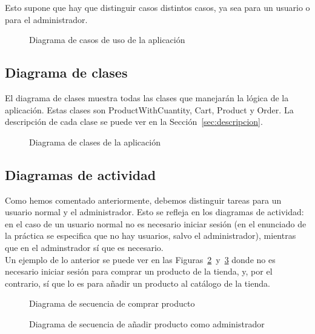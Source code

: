 \documentclass[12pt,a4paper,svgnames]{article}
\begin{document}
Esto supone que hay que distinguir casos distintos casos, ya sea para un usuario o para el administrador.  
\begin{figure}[htbp]
	\centering
	\casosdeuso
	\caption{Diagrama de casos de uso de la aplicación}
	\label{fig:casosdeuso}
\end{figure}

\clearpage

\subsection{Diagrama de clases}

El diagrama de clases muestra todas las clases que manejarán la lógica de la aplicación. Estas clases son ProductWithCuantity, Cart, Product y Order. La descripción de cada clase se puede ver en la Sección~\ref{sec:descripcion}.

\begin{figure}[htbp] 
	\centering
	\clases
	\caption{Diagrama de clases de la aplicación}
\end{figure}

\subsection{Diagramas de actividad}

Como hemos comentado anteriormente, debemos distinguir tareas para un usuario normal y el administrador. Esto se refleja en los diagramas de actividad: en el caso de un usuario normal no es necesario iniciar sesión (en el enunciado de la práctica se especifica que no hay usuarios, salvo el administrador), mientras que en el adminstrador sí que es necesario.\\

Un ejemplo de lo anterior se puede ver en las Figuras~\ref{fig:actividad1}~y~\ref{fig:actividad2} donde no es necesario iniciar sesión para comprar un producto de la tienda, y, por el contrario, sí que lo es para añadir un producto al catálogo de la tienda.  

\begin{figure}[htbp] 
	\centering
	\comprarproducto
	\caption{Diagrama de secuencia de comprar producto}
	\label{fig:actividad1}
\end{figure}

\begin{figure}[htbp]
	\centering
	\anadirproductoadministrador
	\caption{Diagrama de secuencia de añadir producto como administrador}
	\label{fig:actividad2}
\end{figure}
\end{document}

